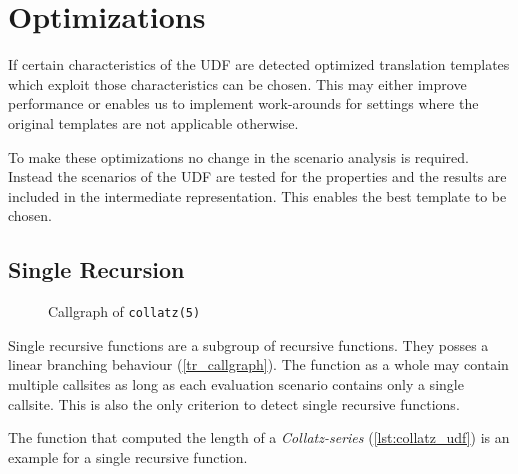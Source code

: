 \chapter{Optimizations}\label{chapter:optimizations}

If certain characteristics of the UDF are detected optimized translation templates which exploit those characteristics can be chosen. This may either improve performance or enables us to implement work-arounds for settings where the original templates are not applicable otherwise.

To make these optimizations no change in the scenario analysis is required. Instead the scenarios of the UDF are tested for the properties and the results are included in the intermediate representation. This enables the best template to be chosen.

\section{Single Recursion}

\begin{wrapfigure}{r}{0.3\textwidth}
  \vspace{-10pt}
  \centering
{}
  \vspace{-10pt}
  \caption{Callgraph of \texttt{collatz(5)}}
  \label{tr_callgraph}
\end{wrapfigure}

Single recursive functions are a subgroup of recursive functions. They posses a linear branching behaviour (\autoref{tr_callgraph}). The function as a whole may contain multiple callsites as long as each evaluation scenario contains only a single callsite. This is also the only criterion to detect single recursive functions.

The function that computed the length of a \textit{Collatz-series} \cite{collatz} (\autoref{lst:collatz_udf}) is an example for a single recursive function.

